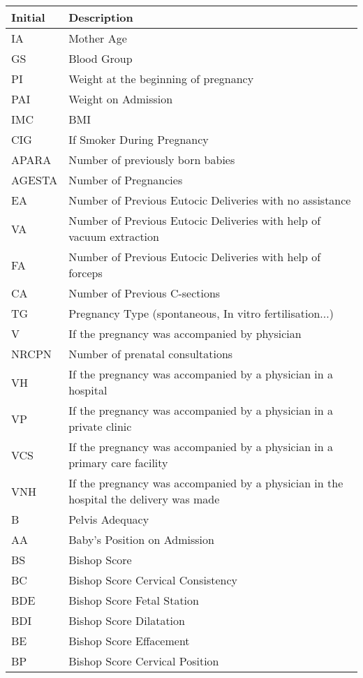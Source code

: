 \begin{table}[H]
\begin{tabularx}{\textwidth}{| l  | X |}
\toprule
Initial  &    Description \\
\midrule
IA &  Mother Age \\
GS  & Blood Group \\
PI &   Weight at the beginning of pregnancy \\
PAI &  Weight on Admission \\
IMC &   BMI \\
CIG &   If Smoker During Pregnancy \\
APARA  & Number of previously born babies\\
AGESTA  &   Number of Pregnancies   \\
EA &     Number of Previous Eutocic Deliveries with no assistance \\
VA &      Number of Previous Eutocic Deliveries with help of vacuum extraction \\
FA &     Number of Previous Eutocic Deliveries with help of forceps \\
CA &   Number of  Previous C-sections \\
TG &     Pregnancy Type (spontaneous, In vitro fertilisation...) \\
V &     If the pregnancy was accompanied by physician \\
NRCPN &     Number of prenatal consultations \\
VH &      If the pregnancy was accompanied by a physician in a hospital \\
VP &    If the pregnancy was accompanied by a physician in a private clinic \\
VCS &  If the pregnancy was accompanied by a physician in a primary care facility \\
VNH &    If the pregnancy was accompanied by a physician in the hospital the delivery was made \\
B  & Pelvis Adequacy \\
AA & Baby's Position on Admission \\
BS &  Bishop Score \\
BC &   Bishop Score Cervical Consistency\\
BDE &  Bishop Score Fetal Station \\
BDI &  Bishop Score Dilatation \\
BE  &   Bishop Score Effacement \\
BP & Bishop Score Cervical Position \\

\end{tabularx}
\end{table}
